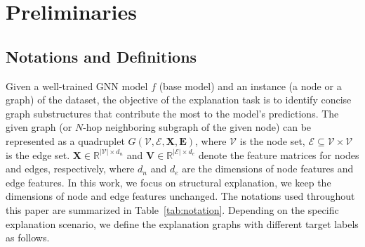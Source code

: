 \section{Preliminaries}\label{sec:pre}
\subsection{Notations and Definitions} \label{sec:notation}
Given a well-trained GNN model $f$ (\aka base model) and an instance (\ie a node or a graph) of the dataset, the objective of the explanation task is to identify concise graph substructures that contribute the most to the model's predictions. The given graph (or $N$-hop neighboring subgraph of the given node) can be represented as a quadruplet $G(\mathcal{V},\mathcal{E}, \mathbf{X}, \mathbf{E})$, where $\mathcal{V}$ is the node set, $\mathcal{E}\subseteq \mathcal{V}\times \mathcal{V}$ is the edge set. $\mathbf{X}\in\mathbb{R}^{|\mathcal{V}|\times d_n}$ and $\mathbf{V}\in\mathbb{R}^{|\mathcal{E}|\times d_e}$ denote the feature matrices for nodes and edges, respectively, where $d_n$ and $d_e$ are the dimensions of node features and edge features. In this work, we focus on structural explanation, \ie we keep the dimensions of node and edge features unchanged. The notations used throughout this paper are summarized in Table~\ref{tab:notation}. Depending on the specific explanation scenario, we define the explanation graphs with different target labels as follows. 
